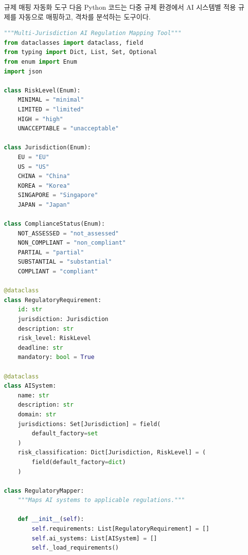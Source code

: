 \begin{practicaltool}{규제 매핑 자동화 도구}
다음 Python 코드는 다중 규제 환경에서 AI 시스템별 적용 규제를 자동으로 매핑하고, 격차를 분석하는 도구이다.

\begin{lstlisting}[language=Python]
"""Multi-Jurisdiction AI Regulation Mapping Tool"""
from dataclasses import dataclass, field
from typing import Dict, List, Set, Optional
from enum import Enum
import json

class RiskLevel(Enum):
    MINIMAL = "minimal"
    LIMITED = "limited"
    HIGH = "high"
    UNACCEPTABLE = "unacceptable"

class Jurisdiction(Enum):
    EU = "EU"
    US = "US"
    CHINA = "China"
    KOREA = "Korea"
    SINGAPORE = "Singapore"
    JAPAN = "Japan"

class ComplianceStatus(Enum):
    NOT_ASSESSED = "not_assessed"
    NON_COMPLIANT = "non_compliant"
    PARTIAL = "partial"
    SUBSTANTIAL = "substantial"
    COMPLIANT = "compliant"

@dataclass
class RegulatoryRequirement:
    id: str
    jurisdiction: Jurisdiction
    description: str
    risk_level: RiskLevel
    deadline: str
    mandatory: bool = True

@dataclass
class AISystem:
    name: str
    description: str
    domain: str
    jurisdictions: Set[Jurisdiction] = field(
        default_factory=set
    )
    risk_classification: Dict[Jurisdiction, RiskLevel] = (
        field(default_factory=dict)
    )

class RegulatoryMapper:
    """Maps AI systems to applicable regulations."""

    def __init__(self):
        self.requirements: List[RegulatoryRequirement] = []
        self.ai_systems: List[AISystem] = []
        self._load_requirements()


\end{lstlisting}
\end{practicaltool}
